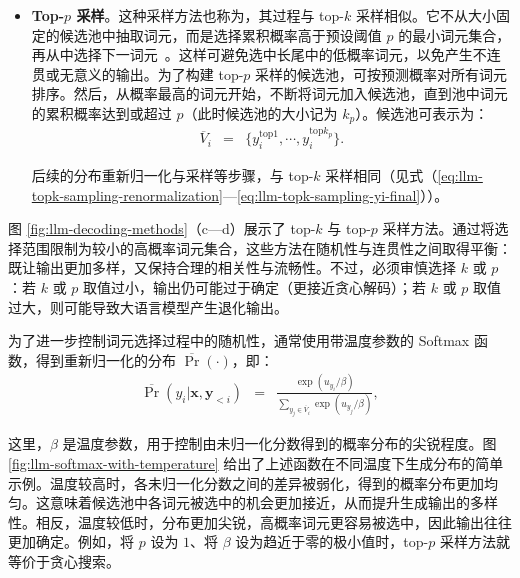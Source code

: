 \begin{itemize}
    对应序列为 $\bar{\mathbf{y}} = y_1\cdots y_{i-1} \bar{y}_i$，而 $Y_i$ 为：
    \begin{eqnarray}
    Y_i & = & \{\bar{\mathbf{y}}\}. \label{eq:llm-topk-sampling-yi-final}
    \end{eqnarray}

\item \vspace{0.3em} \textbf{Top-$p$ 采样}。这种采样方法也称为，其过程与 top-$k$ 采样相似。它不从大小固定的候选池中抽取词元，而是选择累积概率高于预设阈值 $p$ 的最小词元集合，再从中选择下一词元~\cite{holtzman-etal:2020the}。这样可避免选中长尾中的低概率词元，以免产生不连贯或无意义的输出。为了构建 top-$p$ 采样的候选池，可按预测概率对所有词元排序。然后，从概率最高的词元开始，不断将词元加入候选池，直到池中词元的累积概率达到或超过 $p$（此时候选池的大小记为 $k_p$）。候选池可表示为：
    \begin{eqnarray}
    \overline{V}_i & = & \{y_i^{\mathrm{top}1},\cdots,y_i^{\mathrm{top}{k_p}}\}.
    \end{eqnarray}

    后续的分布重新归一化与采样等步骤，与 top-$k$ 采样相同（见式（\ref{eq:llm-topk-sampling-renormalization}—\ref{eq:llm-topk-sampling-yi-final}））。
\end{itemize}
\vspace{0.5em}

图 \ref{fig:llm-decoding-methods}（c—d）展示了 top-$k$ 与 top-$p$ 采样方法。通过将选择范围限制为较小的高概率词元集合，这些方法在随机性与连贯性之间取得平衡：既让输出更加多样，又保持合理的相关性与流畅性。不过，必须审慎选择 $k$ 或 $p$：若 $k$ 或 $p$ 取值过小，输出仍可能过于确定（更接近贪心解码）；若 $k$ 或 $p$ 取值过大，则可能导致大语言模型产生退化输出。

为了进一步控制词元选择过程中的随机性，通常使用带温度参数的 Softmax 函数，得到重新归一化的分布 $\overline{\Pr}(\cdot)$，即：
\begin{eqnarray}
\overline{\Pr}(y_i|\mathbf{x},\mathbf{y}_{<i}) & = & \frac{\exp(u_{y_i}/\beta)}{\sum_{y_j \in \overline{V}_i} \exp(u_{y_j}/\beta)},
\end{eqnarray}

\noindent 这里，$\beta$ 是温度参数，用于控制由未归一化分数得到的概率分布的尖锐程度。图 \ref{fig:llm-softmax-with-temperature} 给出了上述函数在不同温度下生成分布的简单示例。温度较高时，各未归一化分数之间的差异被弱化，得到的概率分布更加均匀。这意味着候选池中各词元被选中的机会更加接近，从而提升生成输出的多样性。相反，温度较低时，分布更加尖锐，高概率词元更容易被选中，因此输出往往更加确定。例如，将 $p$ 设为 $1$、将 $\beta$ 设为趋近于零的极小值时，top-$p$ 采样方法就等价于贪心搜索。

